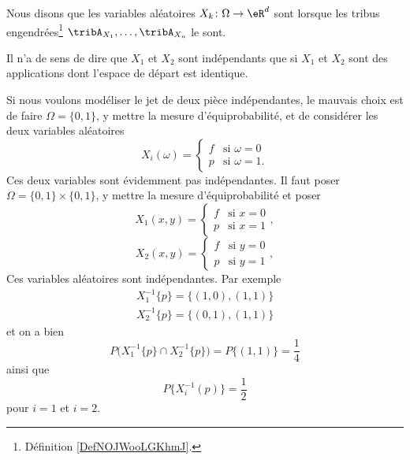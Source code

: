 \begin{definition}  \label{DefNJUkotc}
	Nous disons que les variables aléatoires \( X_k\colon \Omega\to \eR^d\) sont  lorsque les tribus engendrées\footnote{Définition \ref{DefNOJWooLGKhmJ}.} \( \tribA_{X_1},\ldots,\tribA_{X_n}\) le sont.
\end{definition}

\begin{remark}
	Il n'a de sens de dire que \( X_1\) et \( X_2\) sont indépendants que si \( X_1\) et \( X_2\) sont des applications dont l'espace de départ est identique.

	Si nous voulons modéliser le jet de deux pièce indépendantes, le mauvais choix est de faire \( \Omega=\{ 0,1 \}\), y mettre la mesure d'équiprobabilité, et de considérer les deux variables aléatoires
	\begin{equation}
		X_i(\omega)=\begin{cases}
			f & \text{si } \omega=0  \\
			p & \text{si } \omega=1.
		\end{cases}
	\end{equation}
	Ces deux variables sont évidemment pas indépendantes. Il faut poser \( \Omega=\{ 0,1 \}\times \{ 0,1 \}\), y mettre la mesure d'équiprobabilité et poser
	\begin{equation}
		X_1(x,y)=\begin{cases}
			f & \text{si } x=0 \\
			p & \text{si } x=1
		\end{cases},
	\end{equation}
	\begin{equation}
		X_2(x,y)=\begin{cases}
			f & \text{si } y=0 \\
			p & \text{si } y=1
		\end{cases},
	\end{equation}
	Ces variables aléatoires sont indépendantes. Par exemple
	\begin{subequations}
		\begin{align}
			X_1^{-1}\{ p \}=\{ (1,0),(1,1) \} \\
			X_2^{-1}\{ p \}=\{ (0,1),(1,1) \}
		\end{align}
	\end{subequations}
	et on a bien
	\begin{equation}
		P\big( X_1^{-1}\{ p \}\cap X_2^{-1}\{ p \} \big)=P\{ (1,1) \}=\frac{1}{ 4 }
	\end{equation}
	ainsi que
	\begin{equation}
		P\{ X_i^{-1}(p) \}=\frac{ 1 }{2}
	\end{equation}
	pour \( i=1\) et \( i=2\).
\end{remark}

